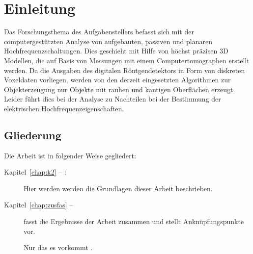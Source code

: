 
\chapter{Einleitung}
Das Forschungsthema des Aufgabenstellers befasst sich mit der computergestützten Analyse von aufgebauten, passiven und planaren Hochfrequenzschaltungen. Dies geschieht mit Hilfe von höchst präzisen 3D Modellen, die auf Basis von Messungen mit einem Computertomographen erstellt werden. Da die Ausgaben des digitalen Röntgendetektors in Form von diskreten Voxeldaten vorliegen, werden von den derzeit eingesetzten Algorithmen zur Objekterzeugung nur Objekte mit rauhen und kantigen Oberflächen erzeugt. Leider führt dies bei der Analyse zu Nachteilen bei der Bestimmung der elektrischen Hochfrequenzeigenschaften. \cite{Bay2005}

\section*{Gliederung}
Die Arbeit ist in folgender Weise gegliedert:
\begin{description}
\item[Kapitel~\ref{chap:k2} -- :] Hier werden werden die Grundlagen dieser Arbeit beschrieben.
\item[Kapitel~\ref{chap:zusfas} -- ] fasst die Ergebnisse der Arbeit zusammen und stellt Anknüpfungspunkte vor.

Nur das es vorkommt \cite{WSPA}.
\end{description}

